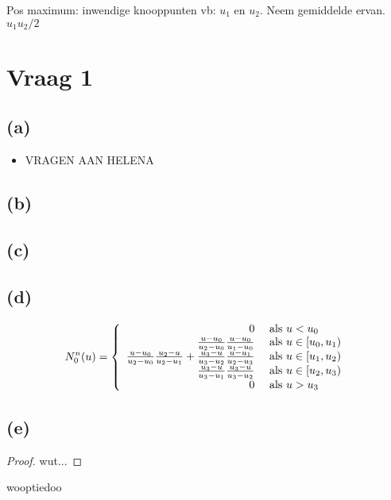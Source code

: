 \documentclass[10pt,a4paper]{article}
\begin{document}
Pos maximum: inwendige knooppunten vb: $u_1$ en $u_2$. Neem gemiddelde ervan. $u_1u_2/2$
\section{Vraag 1}
\subsection*{(a)}
\begin{itemize}
\item
VRAGEN AAN HELENA

\end{itemize}
\subsection*{(b)}
\subsection*{(c)}
\subsection*{(d)}
\[
N_{0}^{n}(u) =
\left\{
\begin{array}{r l}
0 &\text{ als } u < u_0\\
  \frac{u-u_0}{u_2-u_0}\frac{u-u_0}{u_1-u_0} &\text{ als } u \in [u_0,u_1)\\
  \frac{u-u_0}{u_2-u_0}\frac{u_2-u}{u_2-u_1} + \frac{u_3-u}{u_3-u_2}\frac{u-u_1}{u_2-u_3} &\text{ als } u \in [u_1,u_2)\\
  \frac{u_3-u}{u_3-u_1}\frac{u_3-u}{u_3-u_2} &\text{ als } u \in [u_2,u_3)\\
0 &\text{ als } u > u_3\\
\end{array}
\right.
\]
\subsection*{(e)}
\begin{proof}
wut...
\end{proof}


wooptiedoo\\
\end{document}
